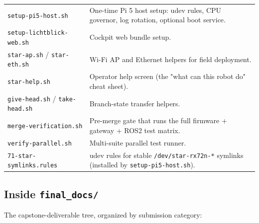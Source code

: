 \begin{center}
\begin{tabular}{|p{3.5cm}|p{11.0cm}|}
\texttt{setup-pi5-host.sh}     & One-time Pi 5 host setup: udev rules, CPU governor, log rotation, optional boot service.                                                                          \\
\texttt{setup-lichtblick-web.sh} & Cockpit web bundle setup.                                                                                                                                       \\
\texttt{star-ap.sh} / \texttt{star-eth.sh} & Wi-Fi AP and Ethernet helpers for field deployment.                                                                                                            \\
\texttt{star-help.sh}          & Operator help screen (the "what can this robot do" cheat sheet).                                                                                                  \\
\texttt{give-head.sh} / \texttt{take-head.sh} & Branch-state transfer helpers.                                                                                                                                 \\
\texttt{merge-verification.sh}  & Pre-merge gate that runs the full firmware + gateway + ROS2 test matrix.                                                                                          \\
\texttt{verify-parallel.sh}     & Multi-suite parallel test runner.                                                                                                                                \\
\texttt{71-star-symlinks.rules} & udev rules for stable \texttt{/dev/star-rx72n-*} symlinks (installed by \texttt{setup-pi5-host.sh}).                                                              \\
\hline
\end{tabular}
\end{center}

\subsection{Inside \texttt{final\_docs/}}

The capstone-deliverable tree, organized by submission category:

